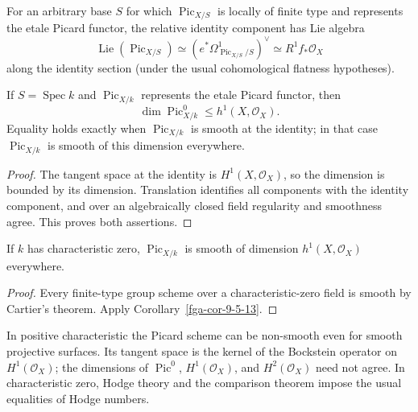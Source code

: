 \begin{remark}\label{fga-rem-9-5-12}\uses{}
For an arbitrary base $S$ for which $\operatorname{Pic}_{X/S}$ is locally of
finite type and represents the etale Picard functor, the relative identity
component has Lie algebra
\[
\operatorname{Lie}(\operatorname{Pic}_{X/S})
 \simeq (e^*\Omega^1_{\operatorname{Pic}_{X/S}/S})^\vee
 \simeq R^1f_*\mathcal O_X
\]
along the identity section (under the usual cohomological flatness hypotheses).
\end{remark}

\begin{corollary}\label{fga-cor-9-5-13}
If $S=\operatorname{Spec}k$ and $\operatorname{Pic}_{X/k}$ represents the etale
Picard functor, then
\[
\dim\operatorname{Pic}^0_{X/k}\le h^1(X,\mathcal O_X).
\]
Equality holds exactly when $\operatorname{Pic}_{X/k}$ is smooth at the identity;
in that case $\operatorname{Pic}_{X/k}$ is smooth of this dimension everywhere.
\end{corollary}
\begin{proof}
The tangent space at the identity is $H^1(X,\mathcal O_X)$, so the dimension is
bounded by its dimension.  Translation identifies all components with the
identity component, and over an algebraically closed field regularity and
smoothness agree.  This proves both assertions.
\end{proof}

\begin{corollary}\label{fga-cor-9-5-14}
If $k$ has characteristic zero, $\operatorname{Pic}_{X/k}$ is smooth of
dimension $h^1(X,\mathcal O_X)$ everywhere.
\end{corollary}
\begin{proof}
Every finite-type group scheme over a characteristic-zero field is smooth by
Cartier's theorem.  Apply Corollary~\ref{fga-cor-9-5-13}.
\end{proof}

\begin{remark}\label{fga-rem-9-5-15}\uses{}
In positive characteristic the Picard scheme can be non-smooth even for smooth
projective surfaces.  Its tangent space is the kernel of the Bockstein operator
on $H^1(\mathcal O_X)$; the dimensions of $\operatorname{Pic}^0$, $H^1(\mathcal
O_X)$, and $H^2(\mathcal O_X)$ need not agree.  In characteristic zero, Hodge
theory and the comparison theorem impose the usual equalities of Hodge numbers.
\end{remark}

